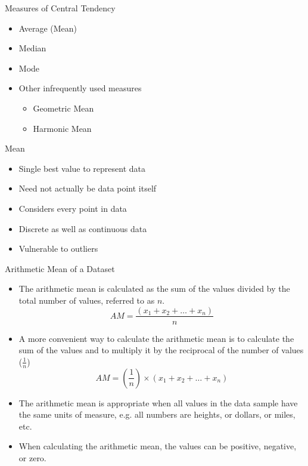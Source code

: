 \begin{frame}[t]{Measures of Central Tendency}
		\begin{itemize}
		\item Average (Mean)
		\item Median
		\item Mode
		\item Other infrequently used measures
		\begin{itemize}
			\item Geometric Mean
			\item Harmonic Mean
		\end{itemize}
	\end{itemize}
\end{frame}
\begin{frame}[t]{Mean}
	\begin{itemize}
		\item Single best value to represent data
		\item Need not actually be data point itself
		\item Considers every point in data
		\item Discrete as well as continuous data
		\item Vulnerable to outliers
	\end{itemize}
\end{frame}


\begin{frame}[t]{Arithmetic Mean of a Dataset}
	\begin{itemize}
		\item The arithmetic mean is calculated as the sum of the values 
		divided by the total number of values, referred to as $n$.\\ 
		$$AM =  \frac{(x_1 + x_2 + … + x_n)}{n} $$
		
		\item A more convenient way to calculate the arithmetic mean is to 
		calculate the sum of the values and to multiply it by the reciprocal of 
		the number of values ($\frac{1}{n}$) \\ 
		$$ AM = (\frac{1}{n}) \times (x_1 + x_2 + … + x_n) $$
		\item The arithmetic mean is appropriate when all values in the data 
		sample have the same units of measure, e.g. all numbers are heights, or 
		dollars, or miles, etc.
		\item When calculating the arithmetic mean, the values can be positive, 
		negative, or zero.
	\end{itemize}
\end{frame}

